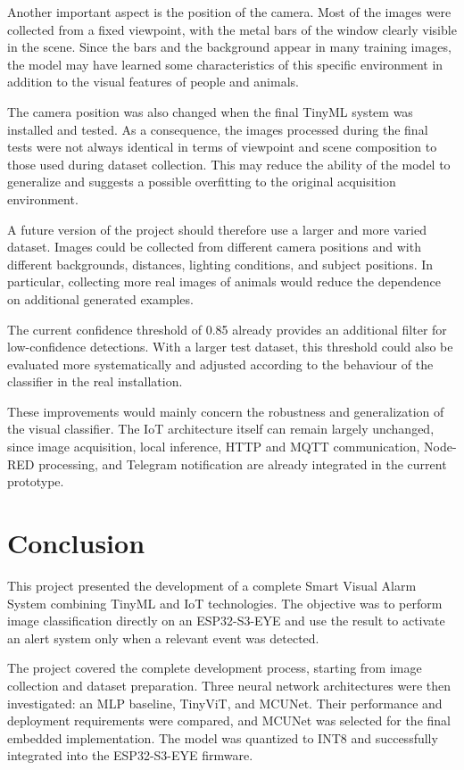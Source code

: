 \documentclass{article}
\begin{document}
Another important aspect is the position of the camera. Most of the images
were collected from a fixed viewpoint, with the metal bars of the window
clearly visible in the scene. Since the bars and the background appear in
many training images, the model may have learned some characteristics of
this specific environment in addition to the visual features of people and
animals.

The camera position was also changed when the final TinyML system was
installed and tested. As a consequence, the images processed during the
final tests were not always identical in terms of viewpoint and scene
composition to those used during dataset collection. This may reduce the
ability of the model to generalize and suggests a possible overfitting to
the original acquisition environment.

A future version of the project should therefore use a larger and more
varied dataset. Images could be collected from different camera positions
and with different backgrounds, distances, lighting conditions, and subject
positions. In particular, collecting more real images of animals would
reduce the dependence on additional generated examples.

The current confidence threshold of 0.85 already provides an additional
filter for low-confidence detections. With a larger test dataset, this
threshold could also be evaluated more systematically and adjusted according
to the behaviour of the classifier in the real installation.

These improvements would mainly concern the robustness and generalization
of the visual classifier. The IoT architecture itself can remain largely
unchanged, since image acquisition, local inference, HTTP and MQTT
communication, Node-RED processing, and Telegram notification are already
integrated in the current prototype.

\section{Conclusion}
\label{sec:conclusion}

This project presented the development of a complete Smart Visual Alarm
System combining TinyML and IoT technologies. The objective was to perform
image classification directly on an ESP32-S3-EYE and use the result to
activate an alert system only when a relevant event was detected.

The project covered the complete development process, starting from image
collection and dataset preparation. Three neural network architectures were
then investigated: an MLP baseline, TinyViT, and MCUNet. Their performance
and deployment requirements were compared, and MCUNet was selected for the
final embedded implementation. The model was quantized to INT8 and
successfully integrated into the ESP32-S3-EYE firmware.
\end{document}
